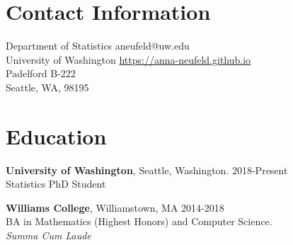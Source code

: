 \documentclass[margin, 10pt]{res} %
\begin{document}
\begin{resume}

 

\section{Contact Information}
Department of Statistics \hfill  aneufeld@uw.edu\\
University of Washington \hfill \href{https://anna-neufeld.github.io}{https://anna-neufeld.github.io} \\
Padelford B-222  \hfill \\
Seattle, WA, 98195



\section{Education} 

{\textbf{University of Washington},} Seattle, Washington. \hfill 2018-Present \\
Statistics PhD Student%

{\textbf{Williams College}}, Williamstown, MA \hfill 2014-2018  \\
BA in Mathematics (Highest Honors) and Computer Science. \\ 
\textit{Summa Cum Laude}%
 

\end{resume}
\end{document}
